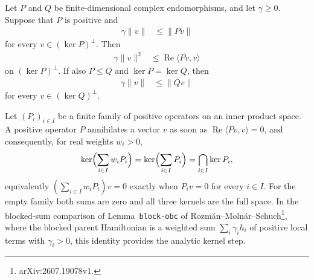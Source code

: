 \begin{lemma}
    \label{lem:positive_gap_transfer_loewner}
    \leanok
    Let $P$ and $Q$ be finite-dimensional complex endomorphisms, and let
    $\gamma\geq0$.  Suppose that $P$ is positive and
    \begin{align}
        \gamma\lVert v\rVert
         & \leq\lVert Pv\rVert
    \end{align}
    for every $v\in(\ker P)^\perp$.  Then
    \begin{align}
        \gamma\lVert v\rVert^2
         & \leq\operatorname{Re}\langle Pv,v\rangle
    \end{align}
    on $(\ker P)^\perp$.  If also $P\leq Q$ and $\ker P=\ker Q$, then
    \begin{align}
        \gamma\lVert v\rVert
         & \leq\lVert Qv\rVert
    \end{align}
    for every $v\in(\ker Q)^\perp$.
\end{lemma}

\begin{lemma}
    \label{thm:weighted_sum_kernel}
    \leanok
    Let $(P_i)_{i\in I}$ be a finite family of positive operators on an
    inner product space.  A positive operator $P$ annihilates a vector $v$
    as soon as $\operatorname{Re}\langle Pv,v\rangle=0$, and consequently,
    for real weights $w_i>0$,
    \begin{align}
        \ker\Bigl(\sum_{i\in I}w_iP_i\Bigr)
        =\ker\Bigl(\sum_{i\in I}P_i\Bigr)
        =\bigcap_{i\in I}\ker P_i,
        \label{eq:ph_weighted_sum_kernel}
    \end{align}
    equivalently $(\sum_{i\in I}w_iP_i)v=0$ exactly when $P_iv=0$ for
    every $i\in I$.  For the empty family both sums are zero and all three
    kernels are the full space.  In the blocked-sum comparison of
    Lemma~\texttt{block-obc} of
    Rozmán--Molnár--Schuch\footnote{arXiv:2607.19078v1.}, where the
    blocked parent Hamiltonian is a weighted sum $\sum_i\gamma_ih_i$ of
    positive local terms with $\gamma_i>0$, this identity provides the
    analytic kernel step.
\end{lemma}

